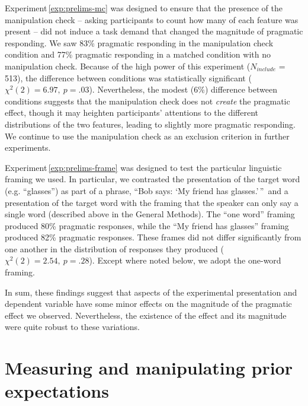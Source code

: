 \documentclass[man,noapacite]{apa2}
\newcounter{Experiment}
\newcommand{\exptref}[1]{Experiment\,\ref{#1}}
\begin{document}
\exptref{exp:prelims-mc} was designed to ensure that the presence of the manipulation check -- asking participants to count how many of each feature was present -- did not induce a task demand that changed the magnitude of pragmatic responding. We saw 83\% pragmatic responding in the manipulation check condition and 77\% pragmatic responding in a matched condition with no manipulation check. Because of the high power of this experiment ($N_{include}$ = 513), the difference between conditions was statistically significant ($\chi^2(2) = 6.97,~p = .03$). Nevertheless, the modest (6\%) difference between conditions suggests that the manipulation check does not \emph{create} the pragmatic effect, though it may heighten participants' attentions to the different distributions of the two features, leading to slightly more pragmatic responding. We continue to use the manipulation check as an exclusion criterion in further experiments.

\exptref{exp:prelims-frame} was designed to test the particular linguistic framing we used. In particular, we contrasted the presentation of the target word (e.g. ``glasses'') as part of a phrase, ``Bob says: `My friend has glasses.'\,''\ and a presentation of the target word with the framing that the speaker can only say a single word (described above in the General Methods). The ``one word'' framing produced 80\% pragmatic responses, while the ``My friend has glasses'' framing produced 82\% pragmatic responses. These frames did not differ significantly from one another in the distribution of responses they produced ($\chi^2(2) = 2.54,~p = .28$). Except where noted below, we adopt the one-word framing.

In sum, these findings suggest that aspects of the experimental presentation and dependent variable have some minor effects on the magnitude of the pragmatic effect we observed. Nevertheless, the existence of the effect and its magnitude were quite robust to these variations.

\section{Measuring and manipulating prior expectations}
\label{sec:prior}
\end{document}
